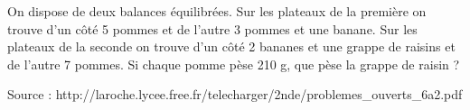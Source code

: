 
On dispose de deux balances équilibrées. Sur les plateaux de la première on trouve d’un côté 5  pommes  et  de  l’autre  3  pommes  et  une  banane.  Sur les  plateaux  de  la  seconde  on  trouve  d’un  côté  2 bananes et une grappe de raisins et de l’autre 7 pommes. Si chaque pomme pèse 210 g, que pèse la grappe de raisin ?

\hfill{{\scriptsize Source : http://laroche.lycee.free.fr/telecharger/2nde/problemes\_ouverts\_6a2.pdf}}
